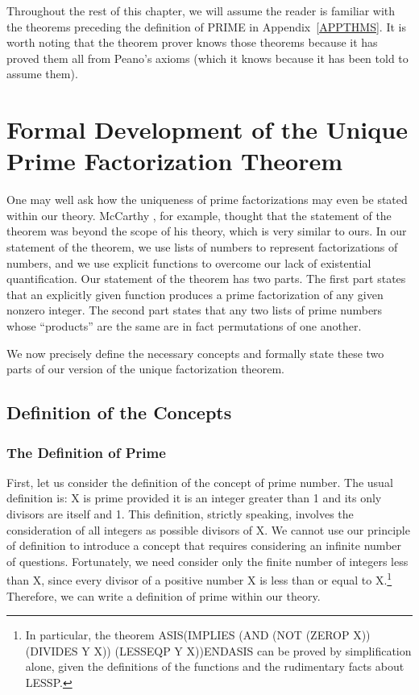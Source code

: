 \documentclass[10pt]{book}
\begin{document}
Throughout the rest of this
chapter, we will assume the reader is familiar with
the theorems preceding the definition of PRIME in Appendix~\ref{APPTHMS}.
It is worth noting that the theorem prover knows those theorems
because it has proved them all from Peano's axioms
(which it knows because it has been told to assume them).

\section{Formal Development of the Unique Prime Factorization Theorem}
One may well ask how the 
uniqueness of prime factorizations may even be stated  within our theory.
McCarthy \cite{MCCARTHYBASIS}, for example,  thought that the
statement of the theorem was beyond the scope of his theory,
which is very similar to ours.  In our statement of the theorem,
we use lists of numbers to represent  factorizations of
numbers, and we  use explicit functions to overcome our	
lack of existential quantification.  Our statement of the	
theorem has  two parts.   The first  part states
that an explicitly given function  produces a prime factorization of any given nonzero
integer.    The second  part states that
any two lists of prime numbers whose ``products''
are the same are in fact  permutations of one
another.			

We  now  precisely define the necessary concepts and
formally state these two parts of our version of the unique factorization
theorem.

\subsection{Definition of the Concepts}
\subsubsection{The Definition of Prime}
First, let us consider the definition of the
concept of prime number.
The usual definition is:  X is prime provided it is an integer greater than 1 and its
only divisors are itself and 1.  This definition,
strictly speaking, involves the consideration of
all integers as possible divisors of X.
We cannot use
our principle of definition to introduce a concept that requires
considering  an infinite number of questions.  
Fortunately, we  need   consider only the finite	
number of integers less than X, since every divisor of a positive
number X is
less than or equal to X.\footnote{In particular, the theorem {ASIS}(IMPLIES (AND (NOT (ZEROP X)) (DIVIDES Y X)) (LESSEQP Y X)){ENDASIS} can be proved by simplification alone, given the definitions of the functions and the rudimentary facts about LESSP.}
Therefore, we can write
a definition of prime within our theory.
\end{document}
